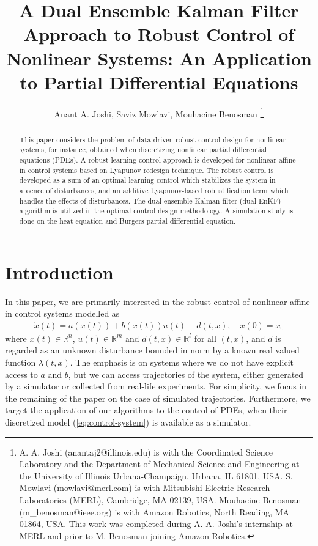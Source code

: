 \documentclass[letterpaper, 10 pt, conference]{ieeeconf}  %
\title{\LARGE \bf
A Dual Ensemble Kalman Filter Approach to Robust Control of Nonlinear Systems: An Application to Partial Differential Equations
}
\author{Anant A. Joshi, Saviz Mowlavi, Mouhacine Benosman%
\thanks{A. A. Joshi (anantaj2@illinois.edu) is with the Coordinated Science Laboratory and the Department of Mechanical Science and Engineering at the University of Illinois Urbana-Champaign, Urbana, IL 61801, USA. S. Mowlavi (mowlavi@merl.com) is with Mitsubishi Electric Research Laboratories (MERL), Cambridge, MA 02139, USA. Mouhacine Benosman (m\_benosman@ieee.org) is with Amazon Robotics, North Reading, MA 01864, USA. This work was completed during A. A. Joshi’s internship at
MERL and prior to M. Benosman joining Amazon Robotics.}%
}
\newcommand{\R}{\mathbb{R}}
\begin{document}
\maketitle
\thispagestyle{empty}
\pagestyle{empty}


\begin{abstract}

This paper considers the problem of data-driven robust control design for nonlinear systems, for instance, obtained when discretizing nonlinear partial differential equations (PDEs). A robust learning control approach is developed for nonlinear affine in control systems based on Lyapunov redesign technique. The robust control is developed as a sum of an optimal learning control which stabilizes the system in absence of disturbances, and an additive Lyapunov-based robustification term which handles the effects of disturbances. The dual ensemble Kalman filter (dual EnKF) algorithm is utilized in the optimal control design methodology. A simulation study is done on the heat equation and Burgers partial differential equation.  

\end{abstract}


\section{Introduction}
In this paper, we are primarily interested in the robust control of nonlinear affine in control systems modelled as 
\begin{align}
\dot{x}(t) = a(x(t)) + b(x(t))u(t) + d(t,x), \quad x(0) = x_0
\label{eq:control-system}
\end{align}
where $x(t) \in \R^n$, $u(t) \in \R^m$ and $d(t,x) \in \R^l$ for all $(t,x)$, and $d$ is regarded as an unknown disturbance bounded in norm by a known real valued function $\lambda(t,x)$. The emphasis is on systems where we do not have explicit access to $a$ and $b$, but we can access trajectories of the system, either generated by a simulator or collected from real-life experiments. For simplicity, we focus in the remaining of the paper on the case of simulated trajectories. 
Furthermore, we target the application of our algorithms to the control of PDEs, when their discretized model (\ref{eq:control-system}) is available as a simulator. 
\end{document}
